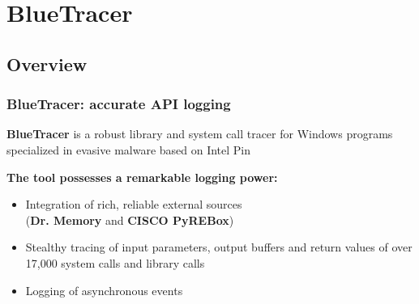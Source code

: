 \documentclass[compress]{beamer}
\begin{document}
\section{BlueTracer}

\subsection{Overview}
\begin{frame}
    \frametitle{BlueTracer: accurate API logging}

\medskip

\begin{beamerboxesrounded}[shadow=true]{}
\textbf{BlueTracer} is a robust library and system call tracer for Windows programs specialized in evasive malware based on Intel Pin
\end{beamerboxesrounded}

\bigskip

\textcolor{sapienza}{\textbf{The tool possesses a remarkable logging power:}}
\begin{itemize}
\item Integration of rich, reliable external sources \\ (\textbf{Dr. Memory}
and \textbf{CISCO PyREBox})

\item Stealthy tracing of input parameters, output buffers and return values of over 17,000 system calls and library calls
\item Logging of asynchronous events
\end{itemize}    

\end{frame}
\end{document}
